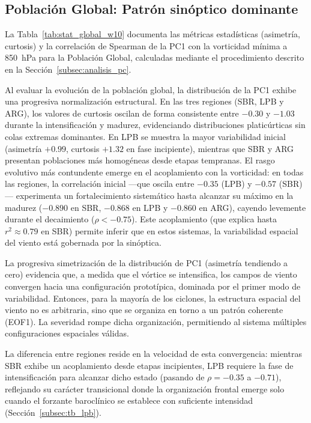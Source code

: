\subsection{Población Global: Patrón sinóptico dominante}

La Tabla~\ref{tab:stat_global_w10} documenta las métricas estadísticas (asimetría, curtosis) y la correlación de Spearman de la PC1 con la vorticidad mínima a 850~hPa para la Población Global, calculadas mediante el procedimiento descrito en la Sección~\ref{subsec:analisis_pc}. 

Al evaluar la evolución de la población global, la distribución de la PC1 exhibe una progresiva normalización estructural. 
En las tres regiones (SBR, LPB y ARG), los valores de curtosis oscilan de forma consistente entre $-0.30$ y $-1.03$ durante la intensificación y madurez, evidenciando distribuciones platicúrticas sin colas extremas dominantes. 
En LPB se muestra la mayor variabilidad inicial (asimetría $+0.99$, curtosis $+1.32$ en fase incipiente), mientras que SBR y ARG presentan poblaciones más homogéneas desde etapas tempranas.
El rasgo evolutivo más contundente emerge en el acoplamiento con la vorticidad: en todas las regiones, la correlación inicial ---que oscila entre $-0.35$ (LPB) y $-0.57$ (SBR)--- experimenta un fortalecimiento sistemático hasta alcanzar su máximo en la madurez ($-0.890$ en SBR, $-0.868$ en LPB y $-0.860$ en ARG), cayendo levemente durante el decaimiento ($\rho < -0.75$). 
Este acoplamiento (que explica hasta $r^2 \approx 0.79$ en SBR) permite inferir que en estos sistemas, la variabilidad espacial del viento está gobernada por la sinóptica. 

La progresiva simetrización de la distribución de PC1 (asimetría tendiendo a cero) evidencia que, a medida que el vórtice se intensifica, los campos de viento convergen hacia una configuración prototípica, dominada por el primer modo de variabilidad. 
Entonces, para la mayoría de los ciclones, la estructura espacial del viento no es arbitraria, sino que se organiza en torno a un patrón coherente (EOF1). 
La severidad rompe dicha organización, permitiendo al sistema múltiples configuraciones espaciales válidas.

La diferencia entre regiones reside en la velocidad de esta convergencia: mientras SBR exhibe un acoplamiento desde etapas incipientes, LPB requiere la fase de intensificación para alcanzar dicho estado (pasando de $\rho = -0.35$ a $-0.71$), reflejando su carácter transicional donde la organización frontal emerge solo cuando el forzante baroclínico se establece con suficiente intensidad (Sección~\ref{subsec:tb_lpb}).


